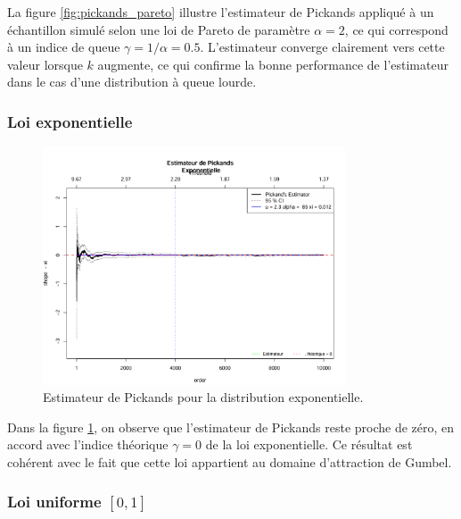 \documentclass{article}
\theoremstyle{plain}
\theoremstyle{definition}
\theoremstyle{plain}
\begin{document}
La figure \ref{fig:pickands_pareto} illustre l’estimateur de Pickands appliqué à un échantillon simulé selon une loi de Pareto de paramètre \(\alpha = 2\), ce qui correspond à un indice de queue \(\gamma = 1/\alpha = 0.5\). L’estimateur converge clairement vers cette valeur lorsque \(k\) augmente, ce qui confirme la bonne performance de l’estimateur dans le cas d’une distribution à queue lourde.

\subsubsection{Loi exponentielle}

\begin{figure}[H]
    \centering
    \includegraphics[width=0.8\textwidth]{./images/exponentielle.png}
    \caption{Estimateur de Pickands pour la distribution exponentielle.}
    \label{fig:pickands_exponentielle}
\end{figure}

Dans la figure \ref{fig:pickands_exponentielle}, on observe que l’estimateur de Pickands reste proche de zéro, en accord avec l’indice théorique \(\gamma = 0\) de la loi exponentielle. Ce résultat est cohérent avec le fait que cette loi appartient au domaine d’attraction de Gumbel.
\subsubsection{Loi uniforme \([0,1]\)}
\end{document}
